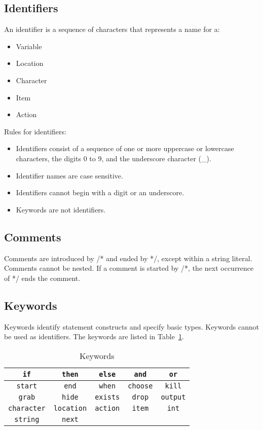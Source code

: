 \documentclass[12pt]{article}
\begin{document}
\subsection{Identifiers}
An identifier is a sequence of characters that represents a name for a:
\begin{itemize}
\item Variable
\item Location
\item Character
\item Item
\item Action \\
\end{itemize}

\noindent Rules for identifiers:
\begin{itemize}
\item Identifiers consist of a sequence of one or more uppercase or lowercase characters, the digits 0 to 9, and the underscore character (\_).
\item Identifier names are case sensitive.
\item Identifiers cannot begin with a digit or an underscore.
\item Keywords are not identifiers.
\end{itemize}

\subsection{Comments}
Comments are introduced by /* and ended by */, except within a string literal.
Comments cannot be nested.  If a comment is started by /*, the next occurrence of */ ends the comment.

\subsection{Keywords}
Keywords identify statement constructs and specify basic types.  Keywords cannot be used as identifiers.  The keywords are listed in Table~\ref{keywords}.

\begin{table}[htdp]
\caption{Keywords}
\begin{center}
\begin{tabular}{|c|c|c|c|c|}
\hline
\texttt{if} & \texttt{then} & \texttt{else} & \texttt{and} & \texttt{or} \\
\hline
\texttt{start} & \texttt{end} & \texttt{when} & \texttt{choose} & \texttt{kill} \\
\hline
\texttt{grab} & \texttt{hide} & \texttt{exists} & \texttt{drop} & \texttt{output} \\
\hline
\texttt{character} & \texttt{location} & \texttt{action} & \texttt{item} & \texttt{int} \\
\hline
\texttt{string} & \texttt{next} & & &  \\
\hline
\end{tabular}
\end{center}
\label{keywords}
\end{table}%
\end{document}
